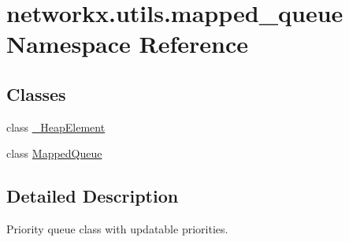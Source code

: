 \hypertarget{namespacenetworkx_1_1utils_1_1mapped__queue}{}\section{networkx.\+utils.\+mapped\+\_\+queue Namespace Reference}
\label{namespacenetworkx_1_1utils_1_1mapped__queue}
\subsection*{Classes}
\begin{DoxyCompactItemize}
\item 
class \hyperlink{classnetworkx_1_1utils_1_1mapped__queue_1_1__HeapElement}{\+\_\+\+Heap\+Element}
\item 
class \hyperlink{classnetworkx_1_1utils_1_1mapped__queue_1_1MappedQueue}{Mapped\+Queue}
\end{DoxyCompactItemize}


\subsection{Detailed Description}
\begin{DoxyVerb}Priority queue class with updatable priorities.
\end{DoxyVerb}
 